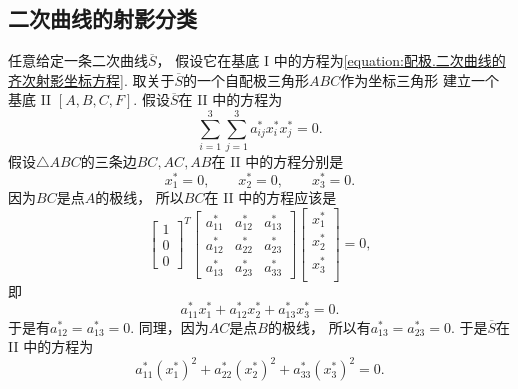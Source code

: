 \subsection{二次曲线的射影分类}
任意给定一条二次曲线\(\overline{S}\)，
假设它在基底 I 中的方程为\cref{equation:配极.二次曲线的齐次射影坐标方程}.
取关于\(\overline{S}\)的一个自配极三角形\(ABC\)作为坐标三角形
建立一个基底 II \([A,B,C,F]\).
假设\(\overline{S}\)在 II 中的方程为\begin{equation*}
	\sum_{i=1}^3 \sum_{j=1}^3 a^*_{ij} x^*_i x^*_j = 0.
\end{equation*}
假设\(\triangle ABC\)的三条边\(BC,AC,AB\)在 II 中的方程分别是\begin{equation*}
	x^*_1 = 0,
	\qquad
	x^*_2 = 0,
	\qquad
	x^*_3 = 0.
\end{equation*}
因为\(BC\)是点\(A\)的极线，
所以\(BC\)在 II 中的方程应该是\begin{equation*}
	\begin{bmatrix}
		1 \\ 0 \\ 0
	\end{bmatrix}^T
	\begin{bmatrix}
		a^*_{11} & a^*_{12} & a^*_{13} \\
		a^*_{12} & a^*_{22} & a^*_{23} \\
		a^*_{13} & a^*_{23} & a^*_{33}
	\end{bmatrix}
	\begin{bmatrix}
		x^*_1 \\
		x^*_2 \\
		x^*_3 \\
	\end{bmatrix}
	= 0,
\end{equation*}
即\begin{equation*}
	a^*_{11} x^*_1
	+ a^*_{12} x^*_2
	+ a^*_{13} x^*_3
	= 0.
\end{equation*}
于是有\(
	a^*_{12}
	= a^*_{13}
	= 0
\).
同理，因为\(AC\)是点\(B\)的极线，
所以有\(
	a^*_{13}
	= a^*_{23}
	= 0
\).
于是\(\overline{S}\)在 II 中的方程为\begin{equation}\label{equation:配极.二次曲线的齐次射影坐标方程-自配极坐标三角形}
	a^*_{11} (x^*_1)^2
	+ a^*_{22} (x^*_2)^2
	+ a^*_{33} (x^*_3)^2
	= 0.
\end{equation}


